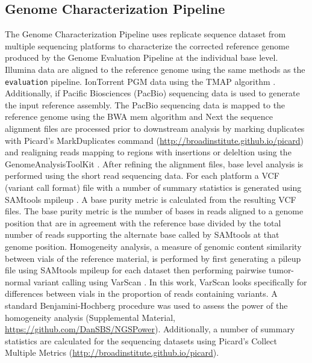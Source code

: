 \documentclass[smallextended]{svjour3}\usepackage[]{graphicx}\usepackage[]{color}
\begin{document}
\subsection{Genome Characterization Pipeline}
\label{method:3}
The Genome Characterization Pipeline uses replicate sequence dataset from multiple sequencing platforms to characterize the corrected reference genome produced by the Genome Evaluation Pipeline at the individual base level. Illumina data are aligned to the reference genome using the same methods as the \texttt{evaluation} pipeline. IonTorrent PGM data using the TMAP algorithm \cite{Homer}. Additionally, if Pacific Biosciences (PacBio) sequencing data is used to generate the input reference assembly.  The PacBio sequencing data is mapped to the reference genome using the BWA mem algorithm \cite{Li2013c} and  Next the sequence alignment files are processed prior to downstream analysis by marking duplicates with Picard's MarkDuplicates command (\url{http://broadinstitute.github.io/picard}) and realigning reads mapping to regions with insertions or deleltion using the GenomeAnalysisToolKit \cite{McKenna2010, DePristo12011}. After refining the alignment files, base level analysis is performed using the short read sequencing data.  For each platform a VCF (variant call format) file with a number of summary statistics is generated using SAMtools mpileup \cite{Li2009}. A base purity metric is calculated from the resulting VCF files. The base purity metric is the number of bases in reads aligned to a genome position that are in agreement with the reference base divided by the total number of reads supporting the alternate base called by SAMtools at that genome position. Homogeneity analysis, a measure of genomic content similarity between vials of the reference material, is performed by first generating a pileup file using SAMtools mpileup for each dataset then performing pairwise tumor-normal variant calling using VarScan \cite{Koboldt2009}. In this work, VarScan looks specifically for differences between vials in the proportion of reads containing variants. A standard Benjamini-Hochberg procedure was used to assess the power of the homogeneity analysis (Supplemental Material, \url{https://github.com/DanSBS/NGSPower}).  Additionally, a number of summary statistics are calculated for the sequencing datasets using Picard's Collect Multiple Metrics (\url{http://broadinstitute.github.io/picard}).  
\end{document}
